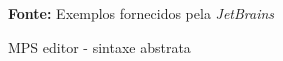 \begin{figure}[h!]
\centering

\caption{\textmd{MPS editor - sintaxe abstrata}}
\label{fig:mpseditor}

\par\medskip\textbf{Fonte:} Exemplos fornecidos pela \textit{JetBrains} \par\medskip
\end{figure}
